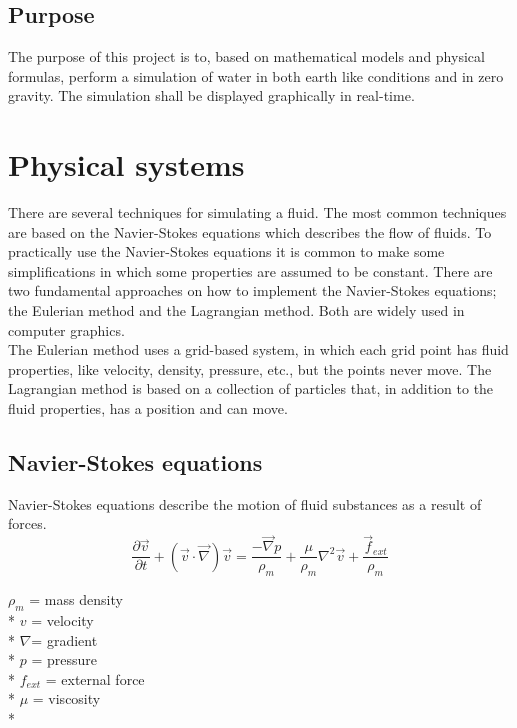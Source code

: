 \documentclass[a4paper,12pt,twoside,final]{report}
\begin{document}
\section{Purpose}
The purpose of this project is to, based on mathematical models and physical formulas, perform a simulation of water in both earth like conditions and in zero gravity. The simulation shall be displayed graphically in real-time.


\chapter{Physical systems}
There are several techniques for simulating a fluid. The most common techniques are based on the Navier-Stokes equations which describes the flow of fluids. To practically use the Navier-Stokes equations it is common to make some simplifications in which some properties are assumed to be constant. There are two fundamental approaches on how to implement the Navier-Stokes equations; the Eulerian method and the Lagrangian method. Both are widely used in computer graphics. \\

\noindent The Eulerian method uses a grid-based system, in which each grid point has fluid properties, like velocity, density, pressure, etc., but the points never move.
The Lagrangian method is based on a collection of particles that, in addition to the fluid properties, has a position and can move.


\section{Navier-Stokes equations}

Navier-Stokes equations describe the motion of fluid substances as a result of forces. \\

\begin{equation}
\frac{\partial \overrightarrow v}{\partial t} + ({\overrightarrow v}\cdot{\overrightarrow \nabla}){\overrightarrow v} = \frac{-\overrightarrow \nabla p}{\rho_m} + \frac{\mu}{\rho_m}{ \nabla^2}{\overrightarrow v} + \frac{\overrightarrow f_{ext}}{\rho_m}
\label{e1}
\end{equation}

\noindent$\rho_m$ = mass density\\*
$v$ = velocity\\*
$\nabla$= gradient\\*
$p$ = pressure\\*
$f_{ext}$ = external force\\*
$\mu$ = viscosity\\*
\end{document}
